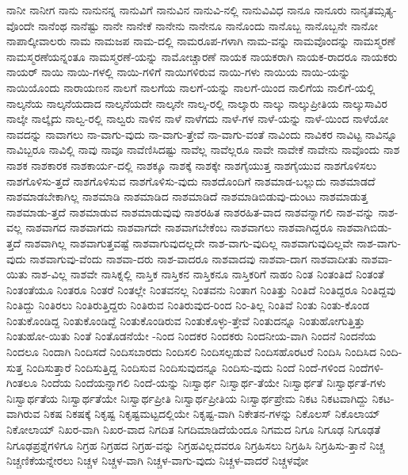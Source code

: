 {ನಾನೀ
ನಾನೀಗ
ನಾನು
ನಾನುನನ್ನ
ನಾನುವಿಗೆ
ನಾನುವಿನ
ನಾನುವಿ-ನಲ್ಲಿ
ನಾನುವಿವಿಧ
ನಾನೂ
ನಾನೂರು
ನಾನೃತಮ್ಸತ್ಯ-ವೊಂದೇ
ನಾನೆಂಥ
ನಾನೆಷ್ಟು
ನಾನೇ
ನಾನೇಕೆ
ನಾನೇನು
ನಾನೇನೂ
ನಾನೊಂದು
ನಾನೊಬ್ಬ
ನಾನೊಬ್ಬನೇ
ನಾನೋ
ನಾಪಾಲ್ಕೀವಾಲರು
ನಾಮ
ನಾಮಜಪ
ನಾಮ-ದಲ್ಲಿ
ನಾಮರೂಪ-ಗಳಾಗಿ
ನಾಮ-ವನ್ನು
ನಾಮವೊಂದನ್ನು
ನಾಮಸ್ಮರಣೆ
ನಾಮಸ್ಮರಣೆಯನ್ನಂತೂ
ನಾಮಸ್ಮರಣೆ-ಯನ್ನು
ನಾಮೋಚ್ಚಾರಣೆ
ನಾಯಕ
ನಾಯಕರಾಗಿ
ನಾಯಕ-ರಾದರೂ
ನಾಯಕರು
ನಾಯರ್
ನಾಯಿ
ನಾಯಿ-ಗಳಲ್ಲಿ
ನಾಯಿ-ಗಳಿಗೆ
ನಾಯಿಗಳಿರುವ
ನಾಯಿ-ಗಳು
ನಾಯಿಯ
ನಾಯಿ-ಯನ್ನು
ನಾಯಿಯೊಂದು
ನಾರಾಯಣನ
ನಾಲಗೆ
ನಾಲಗೆಯ
ನಾಲಗೆ-ಯನ್ನು
ನಾಲಗೆ-ಯಿಂದ
ನಾಲಿಗೆಯ
ನಾಲಿಗೆ-ಯಲ್ಲಿ
ನಾಲ್ಕನೆಯ
ನಾಲ್ಕನೆಯದಾದ
ನಾಲ್ಕನೆಯದೇ
ನಾಲ್ಕನೇ
ನಾಲ್ಕ-ರಲ್ಲಿ
ನಾಲ್ಕಾರು
ನಾಲ್ಕು
ನಾಲ್ಕುಪ್ರೀತಿಯ
ನಾಲ್ಕುಸಾವಿರ
ನಾಲ್ಕೇ
ನಾಲ್ಕೈದು
ನಾಲ್ವ-ರಲ್ಲಿ
ನಾಲ್ವರು
ನಾಳಿನ
ನಾಳೆ
ನಾಳೆಗದು
ನಾಳೆ-ಗಳ
ನಾಳೆ-ಯನ್ನು
ನಾಳೆ-ಯಿಂದ
ನಾಳೆಯೋ
ನಾವದನ್ನು
ನಾವಾಗಲು
ನಾ-ವಾಗು-ವುದು
ನಾ-ವಾಗು-ತ್ತೇವೆ
ನಾ-ವಾಗು-ವಂತೆ
ನಾವಿಂದು
ನಾವಿಕರ
ನಾವಿಟ್ಟ
ನಾವಿನ್ನೂ
ನಾವಿಬ್ಬರೂ
ನಾವಿಲ್ಲಿ
ನಾವು
ನಾವೂ
ನಾವೆಣಿಸಿದಷ್ಟು
ನಾವೆಲ್ಲ
ನಾವೆಲ್ಲರೂ
ನಾವೇ
ನಾವೇಕೆ
ನಾವೇನು
ನಾವೊಂದು
ನಾಶ
ನಾಶಕ
ನಾಶಕಾರಕ
ನಾಶಕಾರ್ಯ-ದಲ್ಲಿ
ನಾಶಕ್ಕೂ
ನಾಶಕ್ಕೆ
ನಾಶಕ್ಕೇ
ನಾಶಗೈಯುತ್ತ
ನಾಶಗೈಯುವ
ನಾಶಗೊಳಿಸಲು
ನಾಶಗೊಳಿಸು-ತ್ತದೆ
ನಾಶಗೊಳಿಸುವ
ನಾಶಗೊಳಿಸು-ವುದು
ನಾಶದೊಂದಿಗೆ
ನಾಶಮಾಡ-ಬಲ್ಲುದು
ನಾಶಮಾಡದೆ
ನಾಶಮಾಡಬೇಕಾಗಿಲ್ಲ
ನಾಶಮಾಡಿ
ನಾಶಮಾಡಿದ
ನಾಶಮಾಡಿದೆ
ನಾಶಮಾಡಿಬಿಡುವು-ದುಂಟು
ನಾಶಮಾಡುತ್ತ
ನಾಶಮಾಡು-ತ್ತದೆ
ನಾಶಮಾಡುವ
ನಾಶಮಾಡುವುವು
ನಾಶರಹಿತ
ನಾಶರಹಿತ-ವಾದ
ನಾಶವನ್ನಾಗಲಿ
ನಾಶ-ವನ್ನು
ನಾಶ-ವಲ್ಲ
ನಾಶವಾಗದ
ನಾಶವಾಗದು
ನಾಶವಾಗದೇ
ನಾಶವಾಗಬೇಕೆಂಬ
ನಾಶವಾಗಲು
ನಾಶವಾಗಿದ್ದರೂ
ನಾಶವಾಗಿಬಿಡು-ತ್ತದೆ
ನಾಶವಾಗಿಲ್ಲ
ನಾಶವಾಗುತ್ತವಷ್ಟೆ
ನಾಶವಾಗುವುದಲ್ಲದೇ
ನಾಶ-ವಾಗು-ವುದಿಲ್ಲ
ನಾಶವಾಗುವುದಿಲ್ಲವೇ
ನಾಶ-ವಾಗು-ವುದು
ನಾಶವಾಗುವು-ವೆಂದು
ನಾಶವಾ-ದರು
ನಾಶ-ವಾದರೂ
ನಾಶವಾದವು
ನಾಶವಾ-ದಾಗ
ನಾಶವಾದೀತು
ನಾಶವಾ-ಯಿತು
ನಾಶ-ವಿಲ್ಲ
ನಾಶವೇ
ನಾಸಿಕ್ನಲ್ಲಿ
ನಾಸ್ತಿಕ
ನಾಸ್ತಿಕನ
ನಾಸ್ತಿಕನೂ
ನಾಸ್ತಿಕರಿಗೆ
ನಾಹಂ
ನಿಂತ
ನಿಂತಂತಿದೆ
ನಿಂತಂತೆ
ನಿಂತಂತೆಯೂ
ನಿಂತರೂ
ನಿಂತರೆ
ನಿಂತಲ್ಲೇ
ನಿಂತವನಲ್ಲ
ನಿಂತವನು
ನಿಂತಾಗ
ನಿಂತಿತ್ತು
ನಿಂತಿದೆ
ನಿಂತಿದ್ದರೂ
ನಿಂತಿದ್ದವು
ನಿಂತಿದ್ದು
ನಿಂತಿರಲು
ನಿಂತಿರುತ್ತಿದ್ದರು
ನಿಂತಿರುವ
ನಿಂತಿರುವುದ-ರಿಂದ
ನಿಂ-ತಿಲ್ಲ
ನಿಂತಿವೆ
ನಿಂತು
ನಿಂತು-ಕೊಂಡ
ನಿಂತುಕೊಂಡಿದ್ದ
ನಿಂತುಕೊಂಡಿದ್ದೆ
ನಿಂತುಕೊಂಡಿರುವ
ನಿಂತುಕೊಳ್ಳು-ತ್ತೇವೆ
ನಿಂತುದನ್ನೂ
ನಿಂತುಹೋಗುತ್ತಿತ್ತು
ನಿಂತುಹೋ-ಯಿತು
ನಿಂತೆ
ನಿಂತೊಡನೆಯೇ
-ನಿಂದ
ನಿಂದಕರ
ನಿಂದಕರು
ನಿಂದನೀಯ-ವಾಗಿ
ನಿಂದನೆ
ನಿಂದನೆಯ
ನಿಂದಲೂ
ನಿಂದಾಗಿ
ನಿಂದಿಸದೆ
ನಿಂದಿಸಬಾರದು
ನಿಂದಿಸಲಿ
ನಿಂದಿಸಲ್ಪಡುವೆ
ನಿಂದಿಸಹೊರಟರೆ
ನಿಂದಿಸಿ
ನಿಂದಿಸಿದ
ನಿಂದಿ-ಸುತ್ತ
ನಿಂದಿಸುತ್ತಾರೆ
ನಿಂದಿಸುತ್ತಿದ್ದ
ನಿಂದಿಸುವ
ನಿಂದಿಸುವುದನ್ನೂ
ನಿಂದಿಸು-ವುದು
ನಿಂದೆ
ನಿಂದೆ-ಗಳಿಂದ
ನಿಂದೆಗಳಿ-ಗಿಂತಲೂ
ನಿಂದೆಯ
ನಿಂದೆಯನ್ನಾಗಲಿ
ನಿಂದೆ-ಯನ್ನು
ನಿಃಸ್ವಾರ್ಥ
ನಿಃಸ್ವಾರ್ಥ-ತೆಯೇ
ನಿಃಸ್ವಾರ್ಥತೆ
ನಿಃಸ್ವಾರ್ಥತೆ-ಗಳು
ನಿಃಸ್ವಾರ್ಥತೆಯ
ನಿಃಸ್ವಾರ್ಥತೆಯೇ
ನಿಃಸ್ವಾರ್ಥಪ್ರೀತಿ
ನಿಃಸ್ವಾರ್ಥಪ್ರೀತಿಯ
ನಿಃಸ್ವಾರ್ಥಪ್ರೇಮ
ನಿಕಟ
ನಿಕಟವಾಗಿದ್ದು
ನಿಕಟ-ವಾಗಿರುವ
ನಿಕಷ
ನಿಕಷಕ್ಕೆ
ನಿಕೃಷ್ಟ
ನಿಕೃಷ್ಟಮಟ್ಟದಲ್ಲಿಯೇ
ನಿಕೃಷ್ಟ-ವಾಗಿ
ನಿಕೇತನ-ಗಳನ್ನು
ನಿಕೊಲಸ್
ನಿಕೊಲಾಯ್
ನಿಕೋಲಾಯ್
ನಿಖರ-ವಾಗಿ
ನಿಖರ-ವಾದ
ನಿಗದಿತ
ನಿಗದಿಮಾಡಿದೆಯೆಂದೂ
ನಿಗಮದ
ನಿಗೂ
ನಿಗೂಢ
ನಿಗೂಢತೆ
ನಿಗೂಢಪ್ರಶ್ನೆಗಳಿಗೂ
ನಿಗ್ರಹ
ನಿಗ್ರಹದ
ನಿಗ್ರಹ-ವನ್ನು
ನಿಗ್ರಹವಿಲ್ಲದವರೂ
ನಿಗ್ರಹಿಸಲು
ನಿಗ್ರಹಿಸಿ
ನಿಗ್ರಹಿಸು-ತ್ತಾನೆ
ನಿಚ್ಚ
ನಿಚ್ಚಣಿಕೆಯನ್ನೇರಲು
ನಿಚ್ಚಳ
ನಿಚ್ಚಳ-ವಾಗಿ
ನಿಚ್ಚಳ-ವಾಗು-ವುದು
ನಿಚ್ಚಳ-ವಾದರೆ
ನಿಚ್ಚಳವೋ
}
